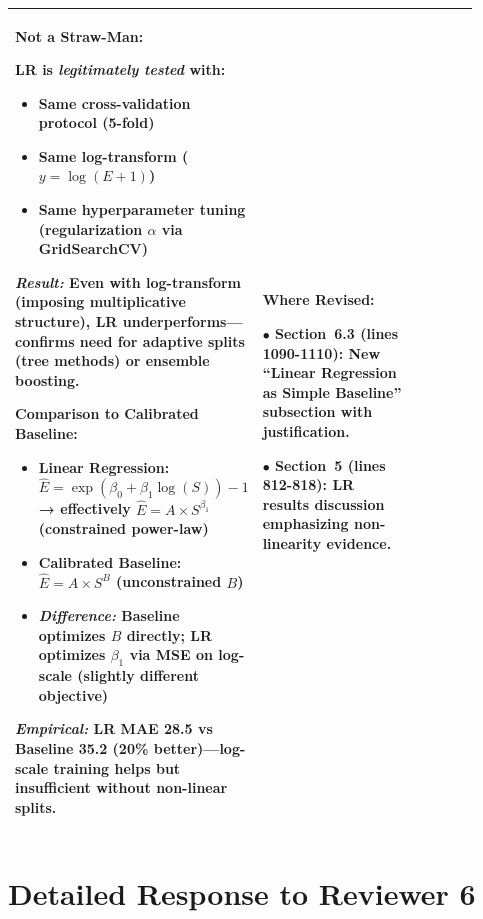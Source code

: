 \documentclass[11pt,a4paper]{article}
\begin{document}
\begin{longtable}{>{\raggedright\arraybackslash}p{0.26\linewidth}|>{\raggedright\arraybackslash}p{0.44\linewidth}|>{\raggedright\arraybackslash}p{0.22\linewidth}}
\textbf{Not a Straw-Man:}

LR is \textit{legitimately tested} with:
\begin{itemize}
    \item Same cross-validation protocol (5-fold)
    \item Same log-transform ($y = \log(E+1)$)
    \item Same hyperparameter tuning (regularization $\alpha$ via GridSearchCV)
\end{itemize}

\textit{Result:} Even with log-transform (imposing multiplicative structure), LR underperforms---confirms need for adaptive splits (tree methods) or ensemble boosting.

\textbf{Comparison to Calibrated Baseline:}

\begin{itemize}
    \item \textbf{Linear Regression}: $\hat{E} = \exp(\beta_0 + \beta_1 \log(S)) - 1$ → effectively $\hat{E} = A \times S^{\beta_1}$ (constrained power-law)
    \item \textbf{Calibrated Baseline}: $\hat{E} = A \times S^B$ (unconstrained $B$)
    \item \textit{Difference:} Baseline optimizes $B$ directly; LR optimizes $\beta_1$ via MSE on log-scale (slightly different objective)
\end{itemize}

\textit{Empirical:} LR MAE 28.5 vs Baseline 35.2 (20\% better)---log-scale training helps but insufficient without non-linear splits. &

\textbf{Where Revised:}

$\bullet$ \textbf{Section~6.3} (lines 1090-1110): New ``Linear Regression as Simple Baseline'' subsection with justification.

$\bullet$ \textbf{Section~5} (lines 812-818): LR results discussion emphasizing non-linearity evidence. \\

\bottomrule
\end{longtable}


\section*{Detailed Response to Reviewer 6}
\end{document}
